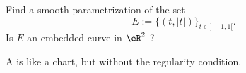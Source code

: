 \begin{exercice}\label{exo002}

Find a smooth parametrization of the set
\[
E:=\{(t,|t|)\}_{t\in]-1,1[}.
\]
Is $E$ an embedded curve in $\eR^2$ ?

A  is like a chart, but without the regularity condition.

\end{exercice}
